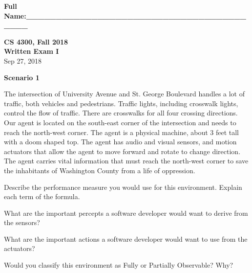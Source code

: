 \documentclass[11pt]{article}
\begin{document}
\begin{flushright}
{\large\bf Full Name:\_\_\_\_\_\_\_\_\_\_\_\_\_\_\_\_\_\_\_\_\_\_\_\_\_\_\_\_\_\_\_\_\_\_\_\_\_\_\_\_\_ } \\[1ex]
\end{flushright}
\vspace*{0.5 in}

\setcounter{maxpage}{8}

\begin{center}
{\LARGE\bf CS 4300, Fall 2018\\ [2 ex]
Written Exam I}\\ [2 ex]
Sep 27, 2018
\end{center}

\textbf{Scenario 1}

The intersection of University Avenue and St. George Boulevard handles a lot of traffic,
both vehicles and pedestrians.  Traffic lights, including crosswalk lights, control the flow of traffic.
There are crosswalks for all four crossing directions.  Our agent is located on the
south-east corner of the intersection and needs to reach the north-west corner.
The agent is a physical machine, about 3 feet tall with a doom shaped top.  
The agent has audio and visual sensors, and motion actuators that allow the agent to move
forward and rotate to change direction. The agent carries vital information that must
reach the north-west corner to save the inhabitants of Washington County from
a life of oppression.

\begin{problem}{2}
  Describe the performance measure you would use for this environment. Explain each term of the formula.
  \vspace*{1.5in}
\end{problem}

\begin{problem}{2}
  What are the important percepts a software developer would want to derive from the sensors?
  \vspace*{1in}
\end{problem}

\begin{problem}{2}
  What are the important actions a software developer would want to use from the actuators?
  \vspace*{1in}
\end{problem}

\begin{problem}{2}
  Would you classify this environment as Fully or Partially Observable? Why?
  \vspace*{1in}
\end{problem}
\end{document}
